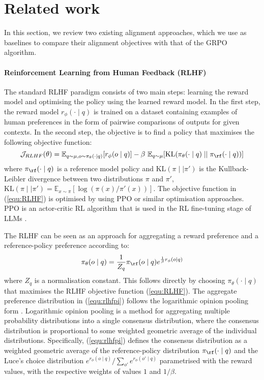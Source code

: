 \section{Related work}

In this section, we review two existing alignment approaches, which we use as baselines to compare their alignment objectives with that of the GRPO algorithm. 

\paragraph{Reinforcement Learning from Human Feedback (RLHF)} The standard RLHF paradigm \citep{Christiano2017,Stiennon2020} consists of two main steps: learning the reward model and optimising the policy using the learned reward model. In the first step, the reward model $r_\phi(\cdot\mid q)$ is trained on a dataset containing examples of human preferences in the form of pairwise comparisons of outputs for given contexts. In the second step, the objective is to find a policy that maximises the following objective function:
\begin{equation}
\mathcal{J}_{RLHF}(\theta) = \mathbb{E}_{q\sim \mu, o\sim \pi_\theta(\cdot\mid q)}[r_\phi(o\mid q)] - \beta\ \mathbb{E}_{q\sim \mu}[\mathrm{KL}(\pi_\theta(\cdot\mid q)\mid\mid \pi_{\rf}(\cdot \mid q))]
\label{equ:RLHF}
\end{equation}
where $\pi_\rf(\cdot\mid q)$ is a reference model policy and $\mathrm{KL}(\pi\mid\mid \pi')$ is the Kullback-Leibler divergence between two distributions $\pi$ and $\pi'$, $\mathrm{KL}(\pi\mid \mid \pi')=\mathbb{E}_{x\sim \pi}[\log(\pi(x)/\pi'(x))]$. The objective function in (\ref{equ:RLHF}) is optimised by using PPO \citep{schulman2017ppo} or similar optimisation approaches. PPO is an actor-critic RL algorithm that is used in the RL fine-tuning stage of LLMs \citep{Ouyang2011}.

The RLHF can be seen as an approach for aggregating a reward preference and a reference-policy preference according to:
\begin{equation}
\pi_\theta(o\mid q ) = \frac{1}{Z_q}\pi_{\rf}(o\mid q) e^{\frac{1}{\beta}r_\phi(o\mid q)}
\label{equ:rlhfpi}
\end{equation}
where $Z_q$ is a normalisation constant. This follows directly by choosing $\pi_\theta(\cdot\mid q)$ that maximises the RLHF objective function (\ref{equ:RLHF}). The aggregate preference distribution in (\ref{equ:rlhfpi}) follows the logarithmic opinion pooling form \citep{logarithmic}. Logarithmic opinion pooling is a method for aggregating multiple probability distributions into a single consensus distribution, where the consensus distribution is proportional to some weighted geometric average of the individual distributions. Specifically, (\ref{equ:rlhfpi}) defines the consensus distribution as a weighted geometric average of the reference-policy distribution $\pi_\rf(\cdot\mid q)$ and the Luce's choice \citep{luce1959individual} distribution $e^{r_\phi(o\mid q)}/\sum_{o'}e^{r_\phi(o'\mid q)}$ parametrised with the reward values, with the respective weights of values $1$ and $1/\beta$.  

